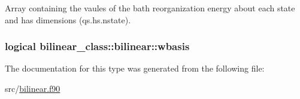 Array containing the vaules of the bath reorganization energy about each state and has dimensions (qs.\-hs.\-nstate). 

\hypertarget{structbilinear__class_1_1bilinear_a78eec2ff8a3e1de38eb02ceeb108ad15}{
\subsubsection[{wbasis}]{\setlength{\rightskip}{0pt plus 5cm}logical bilinear\-\_\-class\-::bilinear\-::wbasis\hspace{0.3cm}{\ttfamily [private]}}}\label{structbilinear__class_1_1bilinear_a78eec2ff8a3e1de38eb02ceeb108ad15}


The documentation for this type was generated from the following file\-:\begin{DoxyCompactItemize}
\item 
src/\hyperlink{bilinear_8f90}{bilinear.\-f90}\end{DoxyCompactItemize}
